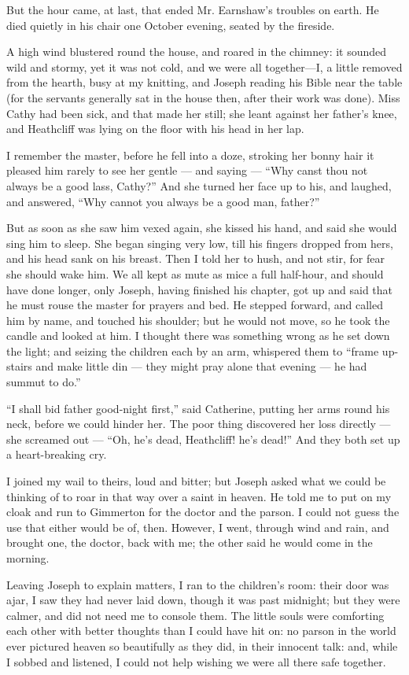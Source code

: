 \par But the hour came, at last, that ended Mr. Earnshaw's troubles on earth. He died quietly in his chair one October evening, seated by the fireside.
\par A high wind blustered round the house, and roared in the chimney: it sounded wild and stormy, yet it was not cold, and we were all together—I, a little removed from the hearth, busy at my knitting, and Joseph reading his Bible near the table (for the servants generally sat in the house then, after their work was done). Miss Cathy had been sick, and that made her still; she leant against her father's knee, and Heathcliff was lying on the floor with his head in her lap.
\par I remember the master, before he fell into a doze, stroking her bonny hair it pleased him rarely to see her gentle — and saying — “Why canst thou not always be a good lass, Cathy?” And she turned her face up to his, and laughed, and answered, “Why cannot you always be a good man, father?”
\par But as soon as she saw him vexed again, she kissed his hand, and said she would sing him to sleep. She began singing very low, till his fingers dropped from hers, and his head sank on his breast. Then I told her to hush, and not stir, for fear she should wake him. We all kept as mute as mice a full half-hour, and should have done longer, only Joseph, having finished his chapter, got up and said that he must rouse the master for prayers and bed. He stepped forward, and called him by name, and touched his shoulder; but he would not move, so he took the candle and looked at him. I thought there was something wrong as he set down the light; and seizing the children each by an arm, whispered them to “frame up-stairs and make little din — they might pray alone that evening — he had summut to do.”
\par “I shall bid father good-night first,” said Catherine, putting her arms round his neck, before we could hinder her. The poor thing discovered her loss directly — she screamed out — “Oh, he's dead, Heathcliff! he's dead!” And they both set up a heart-breaking cry.
\par I joined my wail to theirs, loud and bitter; but Joseph asked what we could be thinking of to roar in that way over a saint in heaven. He told me to put on my cloak and run to Gimmerton for the doctor and the parson. I could not guess the use that either would be of, then. However, I went, through wind and rain, and brought one, the doctor, back with me; the other said he would come in the morning.
\par Leaving Joseph to explain matters, I ran to the children's room: their door was ajar, I saw they had never laid down, though it was past midnight; but they were calmer, and did not need me to console them. The little souls were comforting each other with better thoughts than I could have hit on: no parson in the world ever pictured heaven so beautifully as they did, in their innocent talk: and, while I sobbed and listened, I could not help wishing we were all there safe together.


